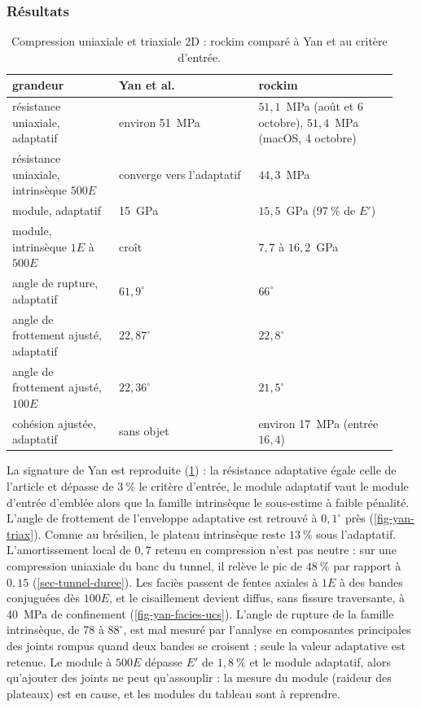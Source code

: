 \subsubsection{Résultats}

\begin{table}[htbp]
\centering
\caption{Compression uniaxiale et triaxiale 2D : rockim comparé à Yan et au critère d'entrée.}
\label{tab-yan-ucs}
\small
\begin{tabular}{@{}p{0.26\linewidth}p{0.34\linewidth}p{0.34\linewidth}@{}}
\toprule
grandeur & Yan et al. & rockim \\
\midrule
résistance uniaxiale, adaptatif & environ 51~MPa & $51{,}1$~MPa (août et 6 octobre), $51{,}4$~MPa (macOS, 4 octobre) \\
résistance uniaxiale, intrinsèque $500E$ & converge vers l'adaptatif & $44{,}3$~MPa \\
module, adaptatif & 15~GPa & $15{,}5$~GPa ($97~\%$ de $E'$) \\
module, intrinsèque $1E$ à $500E$ & croît & $7{,}7$ à $16{,}2$~GPa \\
angle de rupture, adaptatif & $61{,}9^\circ$ & $66^\circ$ \\
angle de frottement ajusté, adaptatif & $22{,}87^\circ$ & $22{,}8^\circ$ \\
angle de frottement ajusté, $100E$ & $22{,}36^\circ$ & $21{,}5^\circ$ \\
cohésion ajustée, adaptatif & sans objet & environ 17~MPa (entrée $16{,}4$) \\
\bottomrule
\end{tabular}
\end{table}

La signature de Yan est reproduite (\cref{tab-yan-ucs}) : la résistance adaptative égale celle de l'article et dépasse de $3~\%$ le critère d'entrée, le module adaptatif vaut le module d'entrée d'emblée alors que la famille intrinsèque le sous-estime à faible pénalité. L'angle de frottement de l'enveloppe adaptative est retrouvé à $0{,}1^\circ$ près (\cref{fig-yan-triax}). Comme au brésilien, le plateau intrinsèque reste $13~\%$ sous l'adaptatif. L'amortissement local de $0{,}7$ retenu en compression n'est pas neutre : sur une compression uniaxiale du banc du tunnel, il relève le pic de $48~\%$ par rapport à $0{,}15$ (\cref{sec-tunnel-duree}). Les faciès passent de fentes axiales à $1E$ à des bandes conjuguées dès $100E$, et le cisaillement devient diffus, sans fissure traversante, à 40~MPa de confinement (\cref{fig-yan-facies-ucs}). L'angle de rupture de la famille intrinsèque, de 78 à $88^\circ$, est mal mesuré par l'analyse en composantes principales des joints rompus quand deux bandes se croisent ; seule la valeur adaptative est retenue. Le module à $500E$ dépasse $E'$ de $1{,}8~\%$ et le module adaptatif, alors qu'ajouter des joints ne peut qu'assouplir : la mesure du module (raideur des plateaux) est en cause, et les modules du tableau sont à reprendre.

